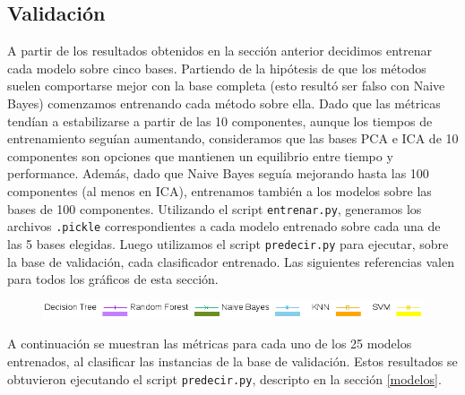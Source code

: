 \documentclass[10pt, a4paper]{article}
\begin{document}
\subsection{Validación}

A partir de los resultados obtenidos en la sección anterior decidimos entrenar cada modelo sobre cinco bases. Partiendo de la hipótesis de que los métodos suelen comportarse mejor con la base completa (esto resultó ser falso con Naive Bayes) comenzamos entrenando cada método sobre ella. Dado que las métricas tendían a estabilizarse a partir de las 10 componentes, aunque los tiempos de entrenamiento seguían aumentando, consideramos que las bases PCA e ICA de 10 componentes son opciones que mantienen un equilibrio entre tiempo y performance. Además, dado que Naive Bayes seguía mejorando hasta las 100 componentes (al menos en ICA), entrenamos también a los modelos sobre las bases de 100 componentes. Utilizando el script \texttt{entrenar.py}, generamos los archivos \texttt{.pickle} correspondientes a cada modelo entrenado sobre cada una de las 5 bases elegidas. Luego utilizamos el script \texttt{predecir.py} para ejecutar, sobre la base de validación, cada clasificador entrenado. Las siguientes referencias valen para todos los gráficos de esta sección.

\begin{figure}[H]
\centering
\includegraphics[scale=0.6]{../src/data/refs.png}
\end{figure}

A continuación se muestran las métricas para cada uno de los 25 modelos entrenados, al clasificar las instancias de la base de validación. Estos resultados se obtuvieron ejecutando el script \texttt{predecir.py}, descripto en la sección \ref{modelos}.
\end{document}
